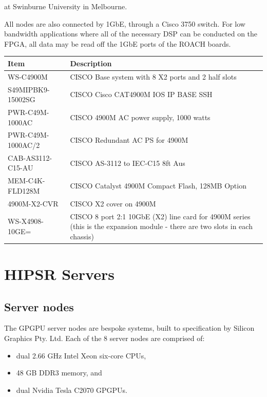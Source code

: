 \documentclass[letterpaper,10pt,english]{sphinxmanual}
\begin{document}
at Swinburne University in Melbourne.

All nodes are also connected by 1GbE, through a Cisco 3750 switch. For low bandwidth applications where all of the necessary DSP can be conducted on the FPGA, all data may be read off the 1GbE ports of the ROACH boards.

\begin{tabulary}{\linewidth}{|L|L|}
\hline
\textbf{\relax 
Item
} & \textbf{\relax 
Description
}\\\hline

WS-C4900M
 & 
CISCO Base system with 8 X2 ports and 2 half slots
\\\hline

S49MIPBK9-15002SG
 & 
CISCO Cisco CAT4900M IOS IP BASE SSH
\\\hline

PWR-C49M-1000AC
 & 
CISCO 4900M AC power supply, 1000 watts
\\\hline

PWR-C49M-1000AC/2
 & 
CISCO Redundant AC PS for 4900M
\\\hline

CAB-AS3112-C15-AU
 & 
CISCO AS-3112 to IEC-C15 8ft Aus
\\\hline

MEM-C4K-FLD128M
 & 
CISCO Catalyst 4900M Compact Flash, 128MB Option
\\\hline

4900M-X2-CVR
 & 
CISCO X2 cover on 4900M
\\\hline

WS-X4908-10GE=
 & 
CISCO 8 port 2:1 10GbE (X2) line card for 4900M series
(this is the expansion module - there are two slots
in each chassis)
\\\hline
\end{tabulary}



\section{HIPSR Servers}
\label{hardware:hipsr-servers}

\subsection{Server nodes}
\label{hardware:server-nodes}
The GPGPU server nodes are bespoke systems, built to specification by Silicon Graphics Pty. Ltd. Each of the 8 server nodes are comprised of:
\begin{itemize}
\item {} 
dual 2.66 GHz Intel Xeon six-core CPUs,

\item {} 
48 GB DDR3 memory, and

\item {} 
dual Nvidia Tesla C2070 GPGPUs.

\end{itemize}
\end{document}

